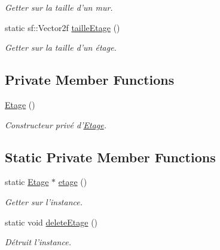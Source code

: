 \begin{DoxyCompactItemize}
\begin{DoxyCompactList}\small\item\em Getter sur la taille d'un mur. \end{DoxyCompactList}\item 
\hypertarget{classPropriete_1_1Etage_aa7a72fa328faf8d101d2486e1e90809c}{static sf\-::\-Vector2f \hyperlink{classPropriete_1_1Etage_aa7a72fa328faf8d101d2486e1e90809c}{taille\-Etage} ()}\label{classPropriete_1_1Etage_aa7a72fa328faf8d101d2486e1e90809c}

\begin{DoxyCompactList}\small\item\em Getter sur la taille d'un étage. \end{DoxyCompactList}\end{DoxyCompactItemize}
\subsection*{Private Member Functions}
\begin{DoxyCompactItemize}
\item 
\hypertarget{classPropriete_1_1Etage_a2d0d40584e7e995f60ddda571cd79415}{\hyperlink{classPropriete_1_1Etage_a2d0d40584e7e995f60ddda571cd79415}{Etage} ()}\label{classPropriete_1_1Etage_a2d0d40584e7e995f60ddda571cd79415}

\begin{DoxyCompactList}\small\item\em Constructeur privé d'\hyperlink{classPropriete_1_1Etage}{Etage}. \end{DoxyCompactList}\end{DoxyCompactItemize}
\subsection*{Static Private Member Functions}
\begin{DoxyCompactItemize}
\item 
\hypertarget{classPropriete_1_1Etage_a565e351aa64dfd30434b2a025030daa5}{static \hyperlink{classPropriete_1_1Etage}{Etage} $\ast$ \hyperlink{classPropriete_1_1Etage_a565e351aa64dfd30434b2a025030daa5}{etage} ()}\label{classPropriete_1_1Etage_a565e351aa64dfd30434b2a025030daa5}

\begin{DoxyCompactList}\small\item\em Getter sur l'instance. \end{DoxyCompactList}\item 
\hypertarget{classPropriete_1_1Etage_a06f36333780035f3c43f6e68b1095e5c}{static void \hyperlink{classPropriete_1_1Etage_a06f36333780035f3c43f6e68b1095e5c}{delete\-Etage} ()}\label{classPropriete_1_1Etage_a06f36333780035f3c43f6e68b1095e5c}

\begin{DoxyCompactList}\small\item\em Détruit l'instance. \end{DoxyCompactList}\end{DoxyCompactItemize}
